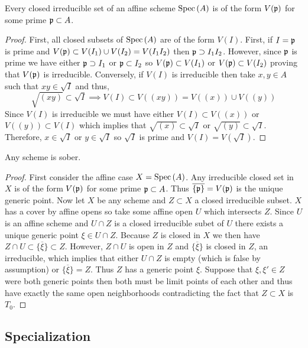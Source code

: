 \documentclass[12pt]{article}
\begin{document}
\begin{lemma}
Every closed irreducible set of an affine scheme $\mathrm{Spec}\left( A \right)$ is of the form $V(\mathfrak{p})$ for some prime $\mathfrak{p} \subset A$. 
\end{lemma}

\begin{proof}
First, all closed subsets of $\mathrm{Spec}\left( A \right)$ are of the form $V(I)$. First, if $I = \mathfrak{p}$ is prime and $V(\mathfrak{p}) \subset V(I_1) \cup V(I_2) = V(I_1 I_2)$ then $\mathfrak{p} \supset I_1 I_2$. However, since $\mathfrak{p}$ is prime we have either $\mathfrak{p} \supset I_1$ or $\mathfrak{p} \subset I_2$ so $V(\mathfrak{p}) \subset V(I_1)$ or $V(\mathfrak{p}) \subset V(I_2)$ proving that $V(\mathfrak{p})$ is irreducible. Conversely, if $V(I)$ is irreducible then take $x, y \in A$ such that $xy \in \sqrt{I}$ and thus,
\[ \sqrt{(xy)} \subset \sqrt{I} \implies V(I) \subset V((xy)) = V((x)) \cup V((y)) \]
Since $V(I)$ is irreducible we must have either $V(I) \subset V((x))$ or $V((y)) \subset V(I)$ which implies that $\sqrt{(x)} \subset \sqrt{I}$ or $\sqrt{(y)} \subset \sqrt{I}$. Therefore, $x \in \sqrt{I}$ or $y \in \sqrt{I}$ so $\sqrt{I}$ is prime and $V(I) = V(\sqrt{I})$.  
\end{proof}

\begin{proposition}
Any scheme is sober. 
\end{proposition}

\begin{proof}
First consider the affine case $X = \mathrm{Spec}\left( A \right)$. Any irreducible closed set in $X$ is of the form $V(\mathfrak{p})$ for some prime $\mathfrak{p} \subset A$. Thus $\overline{\{ \mathfrak{p} \}} = V(\mathfrak{p})$ is the unique generic point. Now let $X$ be any scheme and $Z \subset X$ a closed irreducible subset. $X$ has a cover by affine opens so take some affine open $U$ which intersects $Z$. Since $U$ is an affine scheme and $U \cap Z$ is a closed irreducible subet of $U$ there exists a unique generic point $\xi \in U \cap Z$. Because $Z$ is closed in $X$ we then have $Z \cap U \subset \overline{\{\xi\}} \subset Z$. However, $Z \cap U$ is open in $Z$ and $\overline{\{\xi\}}$ is closed in $Z$, an irreducible, which implies that either $U \cap Z$ is empty (which is false by assumption) or $\overline{\{\xi\}} = Z$. Thus $Z$ has a generic point $\xi$. Suppose that $\xi, \xi' \in Z$ were both generic points then both must be limit points of each other and thus have exactly the same open neighborhoods contradicting the fact that $Z \subset X$ is $T_0$. 
\end{proof}

\subsection{Specialization}
\end{document}
